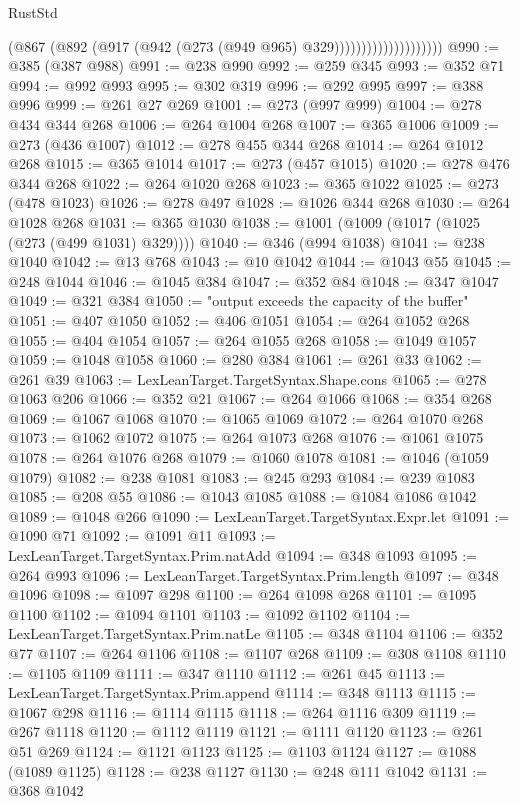 \begin{lexlean}{RustStd}
\begin{coremodule}
{{{{{{{{{{{{{{{{{{{                                  (@867 (@892 (@917 (@942 (@273 (@949 @965) @329))))))))))))))))))))
@990 := @385 (@387 @988)
@991 := @238 @990
@992 := @259 @345
@993 := @352 @71
@994 := @992 @993
@995 := @302 @319
@996 := @292 @995
@997 := @388 @996
@999 := @261 @27 @269
@1001 := @273 (@997 @999)
@1004 := @278 @434 @344 @268
@1006 := @264 @1004 @268
@1007 := @365 @1006
@1009 := @273 (@436 @1007)
@1012 := @278 @455 @344 @268
@1014 := @264 @1012 @268
@1015 := @365 @1014
@1017 := @273 (@457 @1015)
@1020 := @278 @476 @344 @268
@1022 := @264 @1020 @268
@1023 := @365 @1022
@1025 := @273 (@478 @1023)
@1026 := @278 @497
@1028 := @1026 @344 @268
@1030 := @264 @1028 @268
@1031 := @365 @1030
@1038 := @1001 (@1009 (@1017 (@1025 (@273 (@499 @1031) @329))))
@1040 := @346 (@994 @1038)
@1041 := @238 @1040
@1042 := @13 @768
@1043 := @10 @1042
@1044 := @1043 @55
@1045 := @248 @1044
@1046 := @1045 @384
@1047 := @352 @84
@1048 := @347 @1047
@1049 := @321 @384
@1050 := "output exceeds the capacity of the buffer"
@1051 := @407 @1050
@1052 := @406 @1051
@1054 := @264 @1052 @268
@1055 := @404 @1054
@1057 := @264 @1055 @268
@1058 := @1049 @1057
@1059 := @1048 @1058
@1060 := @280 @384
@1061 := @261 @33
@1062 := @261 @39
@1063 := LexLeanTarget.TargetSyntax.Shape.cons
@1065 := @278 @1063 @206
@1066 := @352 @21
@1067 := @264 @1066
@1068 := @354 @268
@1069 := @1067 @1068
@1070 := @1065 @1069
@1072 := @264 @1070 @268
@1073 := @1062 @1072
@1075 := @264 @1073 @268
@1076 := @1061 @1075
@1078 := @264 @1076 @268
@1079 := @1060 @1078
@1081 := @1046 (@1059 @1079)
@1082 := @238 @1081
@1083 := @245 @293
@1084 := @239 @1083
@1085 := @208 @55
@1086 := @1043 @1085
@1088 := @1084 @1086 @1042
@1089 := @1048 @266
@1090 := LexLeanTarget.TargetSyntax.Expr.let
@1091 := @1090 @71
@1092 := @1091 @11
@1093 := LexLeanTarget.TargetSyntax.Prim.natAdd
@1094 := @348 @1093
@1095 := @264 @993
@1096 := LexLeanTarget.TargetSyntax.Prim.length
@1097 := @348 @1096
@1098 := @1097 @298
@1100 := @264 @1098 @268
@1101 := @1095 @1100
@1102 := @1094 @1101
@1103 := @1092 @1102
@1104 := LexLeanTarget.TargetSyntax.Prim.natLe
@1105 := @348 @1104
@1106 := @352 @77
@1107 := @264 @1106
@1108 := @1107 @268
@1109 := @308 @1108
@1110 := @1105 @1109
@1111 := @347 @1110
@1112 := @261 @45
@1113 := LexLeanTarget.TargetSyntax.Prim.append
@1114 := @348 @1113
@1115 := @1067 @298
@1116 := @1114 @1115
@1118 := @264 @1116 @309
@1119 := @267 @1118
@1120 := @1112 @1119
@1121 := @1111 @1120
@1123 := @261 @51 @269
@1124 := @1121 @1123
@1125 := @1103 @1124
@1127 := @1088 (@1089 @1125)
@1128 := @238 @1127
@1130 := @248 @111 @1042
@1131 := @368 @1042
}}}}}}}}}}}}}}}}}}}
\end{coremodule}
\end{lexlean}
